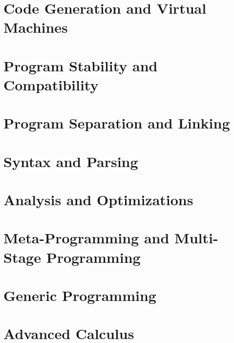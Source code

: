 \documentclass[
  dvipdfmx,
  uplatex,
  japanese,
  titlepage
]{jsbook}
\begin{document}
\chapter{Code Generation and Virtual Machines}

\chapter{Program Stability and Compatibility}

\chapter{Program Separation and Linking}

\chapter{Syntax and Parsing}

\chapter{Analysis and Optimizations}

\chapter{Meta-Programming and Multi-Stage Programming}

\chapter{Generic Programming}

\chapter{Advanced Calculus}



\end{document}
